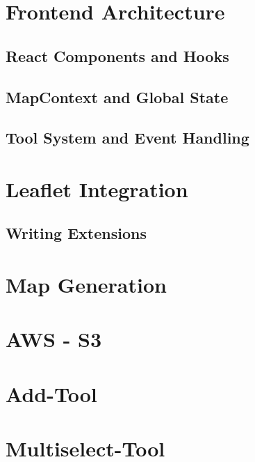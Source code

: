 \section{Frontend Architecture}

\subsection{React Components and Hooks}

\subsection{MapContext and Global State}

\subsection{Tool System and Event Handling}

\section{Leaflet Integration}

\subsection{Writing Extensions}

\section{Map Generation}


\section{AWS - S3}


\section{Add-Tool}

\section{Multiselect-Tool}

